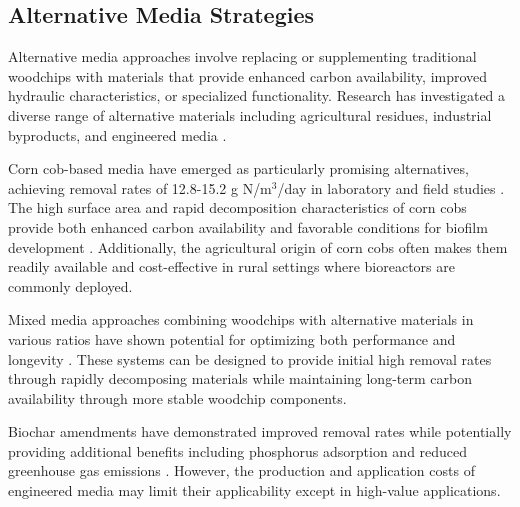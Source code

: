 \documentclass[12pt,a4paper]{article}
\begin{document}
\subsection{Alternative Media Strategies}

Alternative media approaches involve replacing or supplementing traditional woodchips with materials that provide enhanced carbon availability, improved hydraulic characteristics, or specialized functionality.  Research has investigated a diverse range of alternative materials including agricultural residues, industrial byproducts, and engineered media \citep{RN196}.

Corn cob-based media have emerged as particularly promising alternatives, achieving removal rates of 12.8-15.2 g N/m$^3$/day in laboratory and field studies \citep{RN196}. The high surface area and rapid decomposition characteristics of corn cobs provide both enhanced carbon availability and favorable conditions for biofilm development \citep{RN196}. Additionally, the agricultural origin of corn cobs often makes them readily available and cost-effective in rural settings where bioreactors are commonly deployed.


Mixed media approaches combining woodchips with alternative materials in various ratios have shown potential for optimizing both performance and longevity \citep{RN624}. These systems can be designed to provide initial high removal rates through rapidly decomposing materials while maintaining long-term carbon availability through more stable woodchip components.

 Biochar amendments have demonstrated improved removal rates while potentially providing additional benefits including phosphorus adsorption and reduced greenhouse gas emissions \citep{RN350}. However, the production and application costs of engineered media may limit their applicability except in high-value applications.
\end{document}
